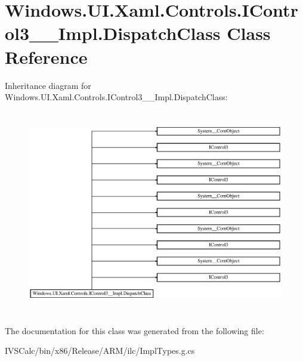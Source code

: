 \hypertarget{class_windows_1_1_u_i_1_1_xaml_1_1_controls_1_1_i_control3_____impl_1_1_dispatch_class}{}\section{Windows.\+U\+I.\+Xaml.\+Controls.\+I\+Control3\+\_\+\+\_\+\+Impl.\+Dispatch\+Class Class Reference}
\label{class_windows_1_1_u_i_1_1_xaml_1_1_controls_1_1_i_control3_____impl_1_1_dispatch_class}
Inheritance diagram for Windows.\+U\+I.\+Xaml.\+Controls.\+I\+Control3\+\_\+\+\_\+\+Impl.\+Dispatch\+Class\+:\begin{figure}[H]
\begin{center}
\leavevmode
\includegraphics[height=8.979592cm]{class_windows_1_1_u_i_1_1_xaml_1_1_controls_1_1_i_control3_____impl_1_1_dispatch_class}
\end{center}
\end{figure}


The documentation for this class was generated from the following file\+:\begin{DoxyCompactItemize}
\item 
I\+V\+S\+Calc/bin/x86/\+Release/\+A\+R\+M/ilc/Impl\+Types.\+g.\+cs\end{DoxyCompactItemize}
